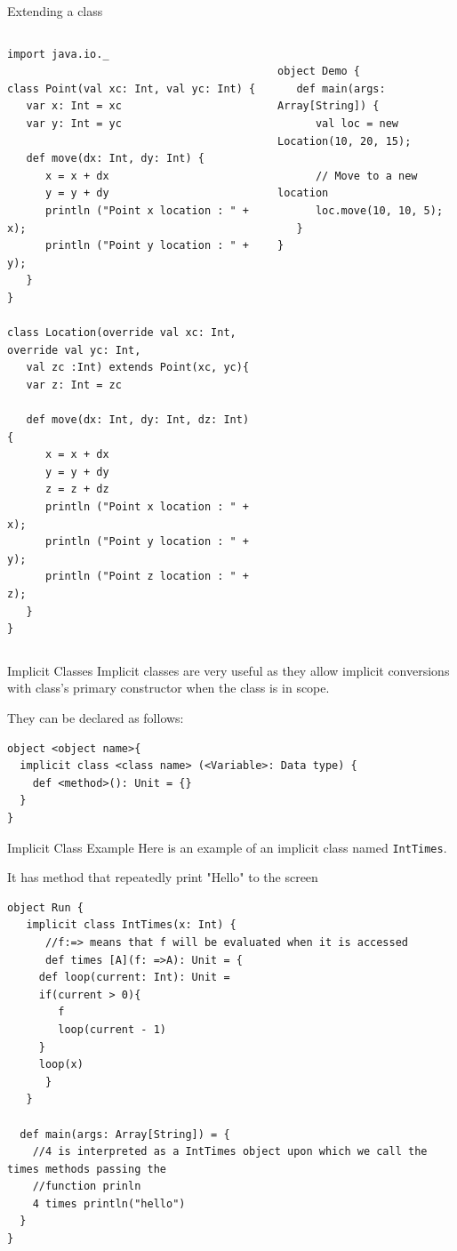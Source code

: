 \documentclass[presentation, aspectratio=169]{beamer}
\begin{document}
\begin{frame}[label={sec:orgd24c411},fragile]{Extending a class}
 \tiny

\begin{columns}
\begin{column}{0.45\columnwidth}
\begin{verbatim}
import java.io._

class Point(val xc: Int, val yc: Int) {
   var x: Int = xc
   var y: Int = yc

   def move(dx: Int, dy: Int) {
      x = x + dx
      y = y + dy
      println ("Point x location : " + x);
      println ("Point y location : " + y);
   }
}

class Location(override val xc: Int, override val yc: Int,
   val zc :Int) extends Point(xc, yc){
   var z: Int = zc

   def move(dx: Int, dy: Int, dz: Int) {
      x = x + dx
      y = y + dy
      z = z + dz
      println ("Point x location : " + x);
      println ("Point y location : " + y);
      println ("Point z location : " + z);
   }
}

\end{verbatim}
\end{column}
\begin{column}{0.45\columnwidth}
\begin{verbatim}

object Demo {
   def main(args: Array[String]) {
      val loc = new Location(10, 20, 15);

      // Move to a new location
      loc.move(10, 10, 5);
   }
}
\end{verbatim}
\end{column}
\end{columns}
\end{frame}
\begin{frame}[label={sec:org1fde4b7},fragile]{Implicit Classes}
 Implicit classes are very useful as they allow implicit conversions with class's primary constructor
when the class is in scope.

They can be declared as follows:
\begin{verbatim}
object <object name>{
  implicit class <class name> (<Variable>: Data type) {
    def <method>(): Unit = {}
  }
}
\end{verbatim}
\end{frame}
\begin{frame}[label={sec:org47c4d73},fragile]{Implicit Class Example}
 Here is an example of an implicit class named \texttt{IntTimes}. 

It has method that repeatedly print "Hello" to the screen
\tiny
\begin{verbatim}
object Run {
   implicit class IntTimes(x: Int) {
      //f:=> means that f will be evaluated when it is accessed
      def times [A](f: =>A): Unit = {
	 def loop(current: Int): Unit =
	 if(current > 0){
	    f
	    loop(current - 1)
	 }
	 loop(x)
      }
   }

  def main(args: Array[String]) = {
    //4 is interpreted as a IntTimes object upon which we call the times methods passing the 
    //function prinln
    4 times println("hello")
  }
}
\end{verbatim}
\end{frame}
\end{document}
